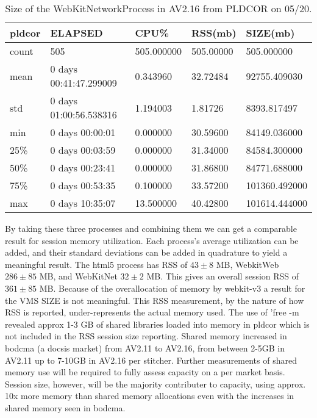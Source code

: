 \documentclass{article}
\begin{document}
\begin{table}[H]
\begin{tabular}{|l|l|l|l|l|}
\hline pldcor &                      ELAPSED  &       CPU\%  &   RSS(mb)   &     SIZE(mb)\\
\hline count  &                    505 &  505.000000 &  505.00000   &   505.000000\\
\hline mean  &  0 days 00:41:47.299009  &   0.343960  &  32.72484  &  92755.409030\\
\hline std  &   0 days 01:00:56.538316  &   1.194003  &   1.81726  &   8393.817497\\
\hline min   &         0 days 00:00:01  &   0.000000  &  30.59600  &  84149.036000\\
\hline 25\%    &        0 days 00:03:59 &    0.000000 &   31.34000 &   84584.300000\\
\hline 50\%    &        0 days 00:23:41 &    0.000000 &   31.86800 &   84771.688000\\
\hline 75\%    &        0 days 00:53:35 &    0.100000 &   33.57200 &  101360.492000\\
\hline max     &       0 days 10:35:07 &   13.500000 &   40.42800 &  101614.444000\\
\hline 
\end{tabular}
\caption{\label{TABLE-AV216WebKitNet}Size of the WebKitNetworkProcess in AV2.16 from PLDCOR on 05/20.} 
\end{table}



By taking these three processes and combining them we can get a comparable result for session memory utilization. Each process's average utilization can be added, and their standard deviations can be added in quadrature to yield a meaningful result. The html5 process has RSS of $43 \pm 8$ MB, WebkitWeb $286 \pm 85$ MB, and WebKitNet $32 \pm 2$ MB. This gives an overall session RSS of $361 \pm 85$ MB. Because of the overallocation of memory by webkit-v3 a result for the VMS SIZE is not meaningful. This RSS measurement, by the nature of how RSS is reported, under-represents the actual memory used. The use of 'free -m revealed approx 1-3 GB of shared libraries loaded into memory in pldcor which is not included in the RSS session size reporting. Shared memory increased in bodcma (a docsis market) from AV2.11 to AV2.16, from between 2-5GB in AV2.11 up to 7-10GB in AV2.16 per stitcher. Further measurements of shared memory use will be required to fully assess capacity on a per market basis. Session size, however, will be the majority contributer to capacity, using approx. 10x more memory than shared memory allocations even with the increases in shared memory seen in bodcma. 
\end{document}
